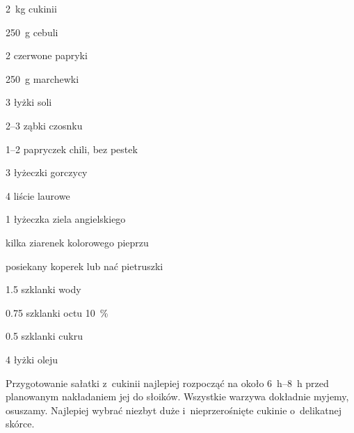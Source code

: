 \documentclass[../main.tex]{subfiles}
\begin{document}

\begin{Ingred}
    \item \qty{2}{\kilo\gram} cukinii
    \item \qty{250}{\gram} cebuli
    \item \num{2} czerwone papryki
    \item \qty{250}{\gram} marchewki
    \item \num{3} łyżki soli
    \item \numrange{2}{3} ząbki czosnku
    \item \numrange{1}{2} papryczek chili, bez pestek
    \item \num{3} łyżeczki gorczycy
    \item \num{4} liście laurowe
    \item \num{1} łyżeczka ziela angielskiego
    \item kilka ziarenek kolorowego pieprzu
    \item posiekany koperek lub nać pietruszki
\end{Ingred}

\begin{Ingred}[zalewa]
    \item \num{1.5} szklanki wody
    \item \num{0.75} szklanki octu \qty{10}{\percent}
    \item \num{0.5} szklanki cukru
    \item \num{4} łyżki oleju
\end{Ingred}

Przygotowanie sałatki z~cukinii najlepiej rozpocząć na około
\qtyrange{6}{8}{\hour} przed planowanym nakładaniem jej do słoików. Wszystkie
warzywa dokładnie myjemy, osuszamy. Najlepiej wybrać niezbyt duże
i~nieprzerośnięte cukinie o~delikatnej skórce.
\end{document}
